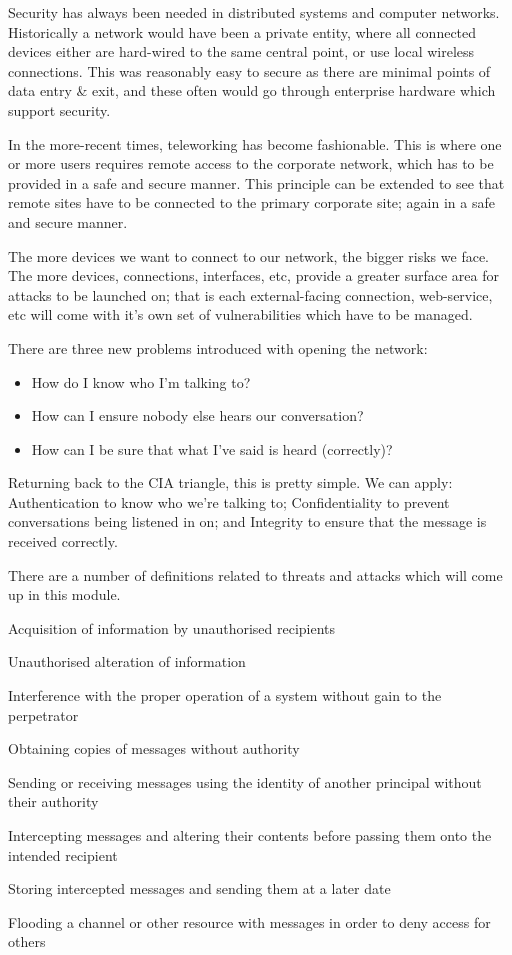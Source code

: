 Security has always been needed in distributed systems and computer networks. Historically a network would have been a private entity, where all connected devices either are hard-wired to the same central point, or use local wireless connections. This was reasonably easy to secure as there are minimal points of data entry \& exit, and these often would go through enterprise hardware which support security. 

In the more-recent times, teleworking has become fashionable. This is where one or more users requires remote access to the corporate network, which has to be provided in a safe and secure manner. This principle can be extended to see that remote sites have to be connected to the primary corporate site; again in a safe and secure manner. 

The more devices we want to connect to our network, the bigger risks we face. The more devices, connections, interfaces, etc, provide a greater surface area for attacks to be launched on; that is each external-facing connection, web-service, etc will come with it's own set of vulnerabilities which have to be managed. 

There are three new problems introduced with opening the network:
\begin{itemize}
    \item How do I know who I'm talking to?
    \item How can I ensure nobody else hears our conversation?
    \item How can I be sure that what I've said is heard (correctly)?
\end{itemize}

Returning back to the CIA triangle, this is pretty simple. We can apply: Authentication to know who we're talking to; Confidentiality to prevent conversations being listened in on; and Integrity to ensure that the message is received correctly. 

There are a number of definitions related to threats and attacks which will come up in this module.

\begin{define}
    \item[Leakage] Acquisition of information by unauthorised recipients
    \item[Tampering] Unauthorised alteration of information
    \item[Vandalism] Interference with the proper operation of a system without gain to the perpetrator
    \item[Eavesdropping] Obtaining copies of messages without authority
    \item[Masquerading] Sending or receiving messages using the identity of another principal without their authority
    \item[Message Tampering] Intercepting messages and altering their contents before passing them onto the intended recipient 
    \item[Replaying] Storing intercepted messages and sending them at a later date
    \item[Denial of Service] Flooding a channel or other resource with messages in order to deny access for others
\end{define}


